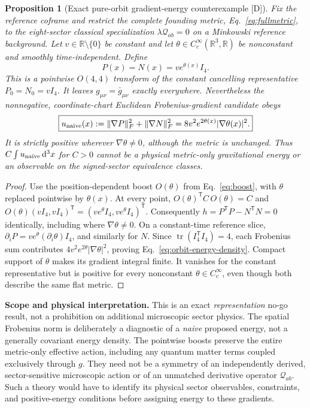 \documentclass[11pt,a4paper]{article}
\newtheorem{proposition}[theorem]{Proposition}
\theoremstyle{definition}\newtheorem{definition}[theorem]{Definition}
\theoremstyle{remark}\newtheorem{remark}[theorem]{Remark}
\newcommand{\Dtag}{\textsf{[D]}}
\newcommand{\dd}{\mathrm d}
\begin{document}
\begin{proposition}[Exact pure-orbit gradient-energy counterexample \Dtag]
\label{prop:energy-redundancy}
Fix the reference coframe and restrict the complete founding metric,
Eq.~\eqref{eq:fullmetric}, to the eight-sector classical specialization
$\lambda\mathcal Q_{ab}=0$ on a Minkowski reference background. Let
$v\in\mathbb R\setminus\{0\}$ be constant and let
$\theta\in C_c^\infty(\mathbb R^3,\mathbb R)$ be nonconstant and
smoothly time-independent. Define
\begin{equation}\label{eq:orbit-energy-pn}
\boxed{P(x)=N(x)=v e^{\theta(x)}I_4.}
\end{equation}
This is a \emph{pointwise} $O(4,4)$ transform of the constant cancelling
representative $P_0=N_0=vI_4$. It leaves $g_{\mu\nu}=\bar g_{\mu\nu}$
exactly everywhere. Nevertheless the nonnegative, coordinate-chart
Euclidean Frobenius-gradient candidate obeys
\begin{equation}\label{eq:orbit-energy-density}
\boxed{u_{\rm naive}(x)
:=\|\nabla P\|_F^2+\|\nabla N\|_F^2
=8v^2e^{2\theta(x)}|\nabla\theta(x)|^2.}
\end{equation}
It is strictly positive wherever $\nabla\theta\ne0$, although the
metric is unchanged. Thus $C\int u_{\rm naive}\,\dd^3x$ for $C>0$ cannot
be a physical metric-only gravitational energy or an observable on the
signed-sector equivalence classes.
\end{proposition}
\begin{proof}
Use the position-dependent boost $O(\theta)$ from
Eq.~\eqref{eq:boost}, with $\theta$ replaced pointwise by
$\theta(x)$. At every point,
$O(\theta)^{\mathsf T}C\,O(\theta)=C$ and
$O(\theta)(vI_4,vI_4)^{\mathsf T}
=(ve^{\theta}I_4,ve^{\theta}I_4)^{\mathsf T}$.
Consequently $h=P^{\mathsf T}P-N^{\mathsf T}N=0$ identically,
including where $\nabla\theta\ne0$. On a constant-time reference
slice, $\partial_iP=ve^\theta(\partial_i\theta)I_4$, and similarly
for $N$. Since $\operatorname{tr}(I_4^{\mathsf T}I_4)=4$, each
Frobenius sum contributes $4v^2e^{2\theta}|\nabla\theta|^2$,
proving Eq.~\eqref{eq:orbit-energy-density}. Compact support of
$\theta$ makes its gradient integral finite. It vanishes for the
constant representative but is positive for every nonconstant
$\theta\in C_c^\infty$, even though both describe the same flat metric.
\end{proof}
\textbf{Scope and physical interpretation.} This is an exact
\emph{representation} no-go result, not a prohibition on additional
microscopic sector physics. The spatial Frobenius norm is deliberately
a diagnostic of a \emph{naive} proposed energy, not a generally
covariant energy density. The pointwise boosts preserve the entire
metric-only effective action, including any quantum matter terms
coupled exclusively through $g$. They need not be a symmetry of an
independently derived, sector-sensitive microscopic action or of an
unmatched derivative operator $\mathcal Q_{ab}$. Such a theory would
have to identify its physical sector observables, constraints, and
positive-energy conditions before assigning energy to these gradients.
\end{document}
